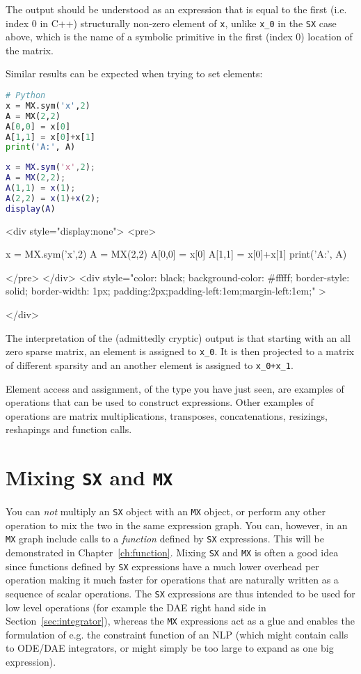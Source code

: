 \documentclass[a4paper,12pt]{book}
\newcounter{pytexcount}
\newcounter{pytexsubcount}
\renewenvironment{pytexoutput}
{\addtocounter{pytexsubcount}{1}%
\begin{rawhtml}
<div style="display:none">
<pre>
\end{rawhtml}
}%
{\begin{rawhtml}
</pre>
</div>
<div style="color: black; background-color: \#fffff;  border-style: solid; border-width: 1px; padding:2px;padding-left:1em;margin-left:1em;" >\end{rawhtml}%
\verbatiminputeval{pytex_\alph{pytexcount}_\arabic{pytexsubcount}.log}%
\begin{rawhtml}
</div>
\end{rawhtml}
}
\begin{document}
The output should be understood as an expression that is equal to the first (i.e. index 0 in C++) structurally non-zero element of \texttt{x}, unlike \texttt{x\_0} in the \texttt{SX} case above, which is the name of a symbolic primitive in the first (index 0) location of the matrix.

Similar results can be expected when trying to set elements:

\begin{minipage}[t]{0.5\textwidth}
\begin{lstlisting}[language=Python]
# Python
x = MX.sym('x',2)
A = MX(2,2)
A[0,0] = x[0]
A[1,1] = x[0]+x[1]
print('A:', A)
\end{lstlisting}
\end{minipage}
\begin{minipage}[t]{0.5\textwidth}
\begin{lstlisting}[language=Matlab]
% MATLAB/Octave
x = MX.sym('x',2);
A = MX(2,2);
A(1,1) = x(1);
A(2,2) = x(1)+x(2);
display(A)
\end{lstlisting}
\end{minipage}

\begin{pytexoutput}
x = MX.sym('x',2)
A = MX(2,2)
A[0,0] = x[0]
A[1,1] = x[0]+x[1]
print('A:', A)
\end{pytexoutput}

The interpretation of the (admittedly cryptic) output is that starting with an all zero sparse matrix, an element is assigned to \texttt{x\_0}. It is then projected to a matrix of different sparsity and an another element is assigned to \texttt{x\_0+x\_1}.

Element access and assignment, of the type you have just seen, are examples of operations that can be used to construct expressions. Other examples of operations are matrix multiplications, transposes, concatenations, resizings, reshapings and function calls.

\section{Mixing \texttt{SX} and \texttt{MX}}
You can \emph{not} multiply an \texttt{SX} object with an \texttt{MX} object, or perform any other operation to mix the two in the same expression graph. You can, however, in an \texttt{MX} graph include calls to a \emph{function} defined by \texttt{SX} expressions. This will be demonstrated in Chapter~\ref{ch:function}. Mixing \texttt{SX} and \texttt{MX} is often a good idea since functions defined by \texttt{SX} expressions have a much lower overhead per operation making it much faster for operations that are naturally written as a sequence of scalar operations. The \texttt{SX} expressions are thus intended to be used for low level operations (for example the DAE right hand side in Section~\ref{sec:integrator}), whereas the \texttt{MX} expressions act as a glue and enables the formulation of e.g. the constraint function of an NLP (which might contain calls to ODE/DAE integrators, or might simply be too large to expand as one big expression).
\end{document}
